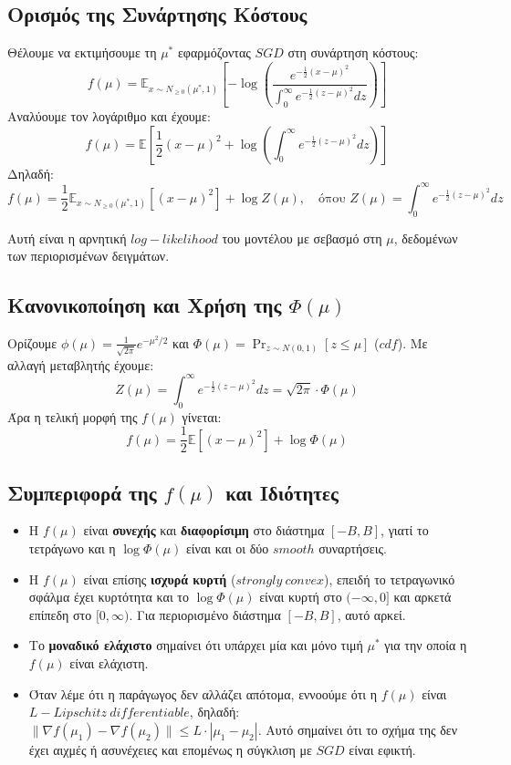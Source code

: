 \documentclass[12pt]{article}
\begin{document}
\subsection*{Ορισμός της Συνάρτησης Κόστους}

Θέλουμε να εκτιμήσουμε τη $\mu^*$ εφαρμόζοντας $SGD$ στη συνάρτηση κόστους:
\[
f(\mu) = \mathbb{E}_{x \sim N_{\geq 0}(\mu^*, 1)} \left[ -\log \left( \frac{e^{-\frac{1}{2}(x - \mu)^2}}{\int_0^\infty e^{-\frac{1}{2}(z - \mu)^2} dz} \right) \right]
\]
Αναλύουμε τον λογάριθμο και έχουμε:
\[
f(\mu) = \mathbb{E} \left[ \frac{1}{2}(x - \mu)^2 + \log \left( \int_0^\infty e^{-\frac{1}{2}(z - \mu)^2} dz \right) \right]
\]
Δηλαδή:
\[
f(\mu) = \frac{1}{2} \mathbb{E}_{x \sim N_{\geq 0}(\mu^*, 1)} [(x - \mu)^2] + \log Z(\mu),
\quad \text{όπου } Z(\mu) = \int_0^\infty e^{-\frac{1}{2}(z - \mu)^2} dz
\]

Αυτή είναι η αρνητική $log-likelihood$ του μοντέλου με σεβασμό στη $\mu$, δεδομένων των περιορισμένων δειγμάτων.

\subsection*{Κανονικοποίηση και Χρήση της $\Phi(\mu)$}

Ορίζουμε $\phi(\mu) = \frac{1}{\sqrt{2\pi}} e^{-\mu^2/2}$ και $\Phi(\mu) = \Pr_{z \sim N(0,1)}[z \leq \mu]$ ($cdf$). Με αλλαγή μεταβλητής έχουμε:
\[
Z(\mu) = \int_0^\infty e^{-\frac{1}{2}(z - \mu)^2} dz = \sqrt{2\pi} \cdot \Phi(\mu)
\]
Άρα η τελική μορφή της $f(\mu)$ γίνεται:
\[
f(\mu) = \frac{1}{2} \mathbb{E}[(x - \mu)^2] + \log \Phi(\mu)
\]

\subsection*{Συμπεριφορά της $f(\mu)$ και Ιδιότητες}

\begin{itemize}
  \item Η $f(\mu)$ είναι \textbf{συνεχής} και \textbf{διαφορίσιμη} στο διάστημα $[-B, B]$, γιατί το τετράγωνο και η $\log\Phi(\mu)$ είναι και οι δύο $smooth$ συναρτήσεις.
  \item Η $f(\mu)$ είναι επίσης \textbf{ισχυρά κυρτή} ($strongly\ convex$), επειδή το τετραγωνικό σφάλμα έχει κυρτότητα και το $\log \Phi(\mu)$ είναι κυρτή στο $(-\infty, 0]$ και αρκετά επίπεδη στο $[0, \infty)$. Για περιορισμένο διάστημα $[-B,B]$, αυτό αρκεί.
  \item Το \textbf{μοναδικό ελάχιστο} σημαίνει ότι υπάρχει μία και μόνο τιμή $\mu^*$ για την οποία η $f(\mu)$ είναι ελάχιστη.
  \item Όταν λέμε ότι η παράγωγος δεν αλλάζει απότομα, εννοούμε ότι η $f(\mu)$ είναι \textbf{$L-Lipschitz\ differentiable$}, δηλαδή: $\|\nabla f(\mu_1) - \nabla f(\mu_2)\| \leq L \cdot |\mu_1 - \mu_2|$. Αυτό σημαίνει ότι το σχήμα της δεν έχει αιχμές ή ασυνέχειες και επομένως η σύγκλιση με $SGD$ είναι εφικτή.
\end{itemize}
\end{document}

